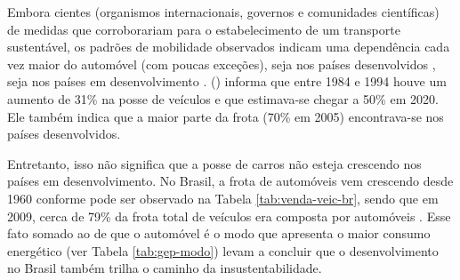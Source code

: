Embora cientes (organismos internacionais, governos e comunidades científicas) de medidas que corroborariam para o estabelecimento de um transporte sustentável, os padrões de mobilidade observados indicam uma dependência cada vez maior do automóvel (com poucas exceções), seja nos países desenvolvidos \cite{BANISTER2005}, seja nos países em desenvolvimento \cite{VASCONCELLOS2012}.  (\citeyear{BANISTER2005}) informa que entre 1984 e 1994 houve um aumento de 31\% na posse de veículos e que estimava-se chegar a 50\% em 2020. Ele também indica que a maior parte da frota (70\% em 2005) encontrava-se nos países desenvolvidos.

Entretanto, isso não significa que a posse de carros não esteja crescendo nos países em desenvolvimento. No Brasil, a frota de automóveis vem crescendo desde 1960 conforme pode ser observado na Tabela \ref{tab:venda-veic-br}, sendo que em 2009, cerca de 79\% da frota total de veículos era composta por automóveis \cite{VASCONCELLOS2012}. Esse fato somado ao de que o automóvel é o modo que apresenta o maior consumo energético (ver Tabela \ref{tab:gep-modo}) levam a concluir que o desenvolvimento no Brasil também trilha o caminho da insustentabilidade.

\clearpage
\begin{table}[htb]
\end{table}

